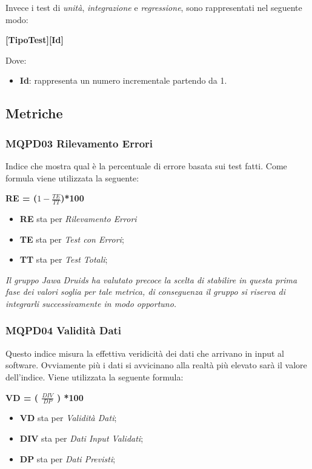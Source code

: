 Invece i test di \textit{unità}, \textit{integrazione} e \textit{regressione}, sono rappresentati nel seguente modo:
\begin{center}
	\textbf{[TipoTest][Id]}
\end{center}
Dove:
\begin{itemize}
	\item \textbf{Id}: rappresenta un numero incrementale partendo da 1.
\end{itemize}


\subsection{Metriche}\label{ProcessiDiSupportoVerificaMetriche}
\subsubsection{MQPD03 Rilevamento Errori}\label{ProcessiDiSupportoVerificaMetricheMQPD03RilevamentoErrori}
Indice che mostra qual è la percentuale di errore basata sui test fatti.
Come formula viene utilizzata la seguente:
\begin{center}
	\textbf{RE = ($1-\frac{TE}{TT}$)*100}
\end{center}
\begin{itemize}
	\item \textbf{RE} sta per \textit{Rilevamento Errori}
	\item \textbf{TE} sta per \textit{Test con Errori};
	\item \textbf{TT} sta per \textit{Test Totali};
\end{itemize}
\textit{Il gruppo \textit{Jawa Druids} ha valutato precoce la scelta di stabilire in questa prima fase dei valori soglia per tale metrica, di conseguenza il gruppo si riserva di integrarli successivamente in modo opportuno.}

\subsubsection{MQPD04 Validità Dati}\label{ProcessiDiSupportoVerificaMetricheMQQPD04ValiditàDati}
Questo indice misura la effettiva veridicità dei dati che arrivano in input al software. Ovviamente più i dati si avvicinano alla realtà più elevato sarà il valore dell'indice.
Viene utilizzata la seguente formula:
\begin{center}
	\textbf{VD = ( $\frac{DIV}{DP}$ ) *100}
\end{center}
\begin{itemize}
	\item \textbf{VD} sta per \textit{Validità Dati};
	\item \textbf{DIV} sta per \textit{Dati Input Validati};
	\item \textbf{DP} sta per \textit{Dati Previsti};
\end{itemize}

